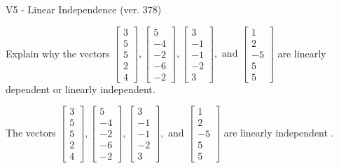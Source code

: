 \begin{exercise}
  \begin{exerciseTitle}V5 - Linear Independence (ver. 378)\end{exerciseTitle}
  \begin{exerciseStatement}
    Explain why the vectors \(\left[\begin{array}{r}
3 \\
5 \\
5 \\
2 \\
4
\end{array}\right] , \left[\begin{array}{r}
5 \\
-4 \\
-2 \\
-6 \\
-2
\end{array}\right] , \left[\begin{array}{r}
3 \\
-1 \\
-1 \\
-2 \\
3
\end{array}\right] , \text{ and } \left[\begin{array}{r}
1 \\
2 \\
-5 \\
5 \\
5
\end{array}\right]\) are linearly dependent or linearly independent.	


  \end{exerciseStatement}
  \begin{exerciseAnswer}
   The vectors \(\left[\begin{array}{r}
3 \\
5 \\
5 \\
2 \\
4
\end{array}\right] , \left[\begin{array}{r}
5 \\
-4 \\
-2 \\
-6 \\
-2
\end{array}\right] , \left[\begin{array}{r}
3 \\
-1 \\
-1 \\
-2 \\
3
\end{array}\right] , \text{ and } \left[\begin{array}{r}
1 \\
2 \\
-5 \\
5 \\
5
\end{array}\right]\) are 
  	 linearly independent  .
  


  \end{exerciseAnswer}
\end{exercise}